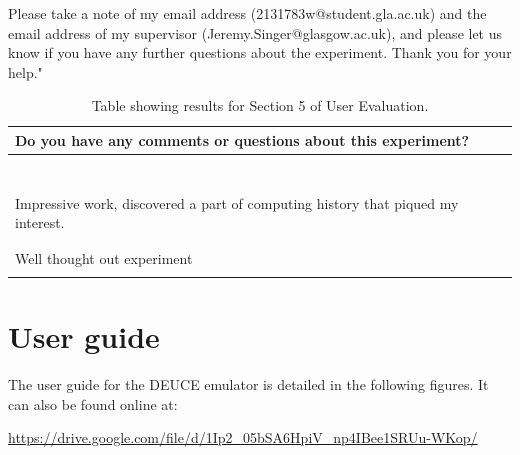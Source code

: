 \documentclass{l4proj}
\begin{document}
\begin{appendices}
Please take a note of my email address (2131783w@student.gla.ac.uk) and the email address of my supervisor (Jeremy.Singer@glasgow.ac.uk), and please let us know if you have any further questions about the experiment. Thank you for your help."

\begin{table}[h]
	\caption{Table showing results for Section 5 of User Evaluation.}
	\label{tab:section-5}
	\begin{tabular}{|l|}
		\hline
		Do you have any comments or questions about this experiment? \\ \hline
		\\ \hline
		\\ \hline
		\\ \hline
		\\ \hline
		\\ \hline
		\\ \hline
		\\ \hline
		Impressive work, discovered a part of computing history that piqued my interest. \\ \hline
		\\ \hline
		\\ \hline
		Well thought out experiment \\ \hline
		\\ \hline
	\end{tabular}
\end{table}

\chapter{User guide}
The user guide for the DEUCE emulator is detailed in the following figures. It can also be found online at:

\url{https://drive.google.com/file/d/1Ip2_05bSA6HpiV_np4IBee1SRUu-WKop/}




\end{appendices}
\end{document}
